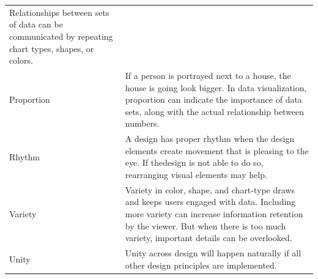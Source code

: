 \documentclass[]{book}
\theoremstyle{definition}
\theoremstyle{definition}
\theoremstyle{definition}
\theoremstyle{remark}
\begin{document}
\begin{longtable}[]{@{}ll@{}}
\begin{minipage}[t]{0.78\columnwidth}
Relationships between sets of data can be communicated by repeating
chart types, shapes, or colors.\strut
\end{minipage}\tabularnewline
\begin{minipage}[t]{0.16\columnwidth}\raggedright\strut
Proportion\strut
\end{minipage} & \begin{minipage}[t]{0.78\columnwidth}\raggedright\strut
If a person is portrayed next to a house, the house is going look
bigger. In data visualization, proportion can indicate the importance of
data sets, along with the actual relationship between numbers.\strut
\end{minipage}\tabularnewline
\begin{minipage}[t]{0.16\columnwidth}\raggedright\strut
Rhythm\strut
\end{minipage} & \begin{minipage}[t]{0.78\columnwidth}\raggedright\strut
A design has proper rhythm when the design elements create movement that
is pleasing to the eye. If thedesign is not able to do so, rearranging
visual elements may help.\strut
\end{minipage}\tabularnewline
\begin{minipage}[t]{0.16\columnwidth}\raggedright\strut
Variety\strut
\end{minipage} & \begin{minipage}[t]{0.78\columnwidth}\raggedright\strut
Variety in color, shape, and chart-type draws and keeps users engaged
with data. Including more variety can increase information retention by
the viewer. But when there is too much variety, important details can be
overlooked.\strut
\end{minipage}\tabularnewline
\begin{minipage}[t]{0.16\columnwidth}\raggedright\strut
Unity\strut
\end{minipage} & \begin{minipage}[t]{0.78\columnwidth}\raggedright\strut
Unity across design will happen naturally if all other design principles
are implemented.\strut
\end{minipage}\tabularnewline
\bottomrule
\end{longtable}
\end{document}
